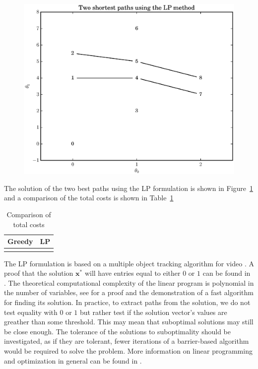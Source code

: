 \begin{figure}[!t]
    \caption{\label{plot:simple_graph_lp_paths}}
    \includegraphics[width=\textwidth]{plots/small_graph_ex_lp_paths.eps}
\end{figure}

The solution of the two best paths using the LP formulation
is shown in Figure~\ref{plot:simple_graph_lp_paths} and a comparison of the
total costs is shown in Table~\ref{tab:greedy_lp_cost_compare}

\begin{table}
    \caption{\label{tab:greedy_lp_cost_compare} Comparison of total costs}
    \begin{center}
        \begin{tabular}{c c}
            Greedy & LP \\
            \hline
             &
             \\
        \end{tabular}
    \end{center}
\end{table}

The LP formulation is based on a multiple object tracking algorithm for video
\cite{jiang2007linear}. A proof that the solution $\boldsymbol{x}^{\ast}$ will
have entries equal to either $0$ or $1$ can be found in
\cite[p.~167]{parker1988discrete}. The theoretical computational complexity of
the linear program is polynomial in the number of variables, see
\cite{karmarkar1984new} for a proof and the demonstration of a fast algorithm
for finding its solution. In practice, to extract paths from the solution, we do
not test equality with $0$ or $1$ but rather test if the solution vector's
values are greather than some threshold. This may mean that suboptimal solutions
may still be close enough. The tolerance of the solutions to suboptimality
should be investigated, as if they are tolerant, fewer iterations of a
barrier-based algorithm would be required to solve the problem. More information
on linear programming and optimization in general can be found in
\cite{boyd2004convex}.

